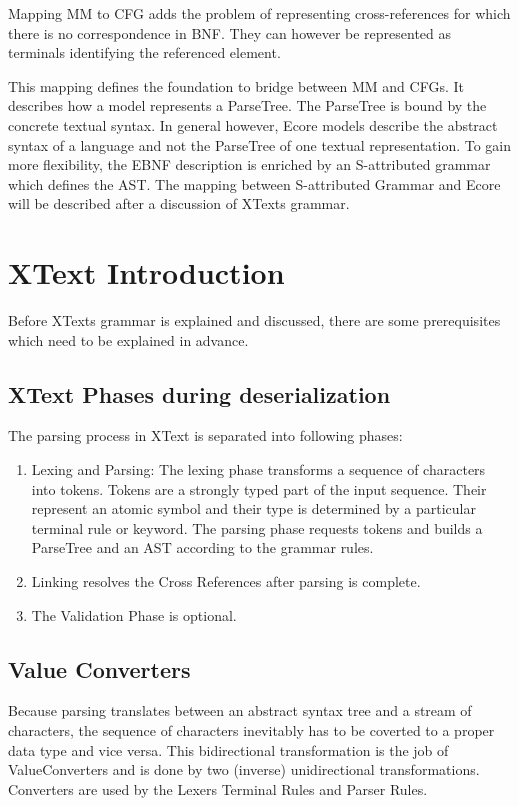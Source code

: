 Mapping MM to CFG adds the problem of representing cross-references for which there is no correspondence in BNF. They can however be represented as terminals identifying the referenced element.   

This mapping defines the foundation to bridge between MM and CFGs. It describes how a model represents a ParseTree. The ParseTree is bound by the concrete textual syntax. In general however, Ecore models describe the abstract syntax of a language and not the ParseTree of one textual representation. To gain more flexibility, the EBNF description is enriched by an S-attributed grammar which defines the AST. The mapping between S-attributed Grammar and Ecore will be described after a discussion of XTexts grammar. 



\section{XText Introduction}
Before XTexts grammar is explained and discussed, there are some prerequisites which need to be explained in advance.

\subsection{XText Phases during deserialization}
The parsing process in XText is separated into following phases:
\begin{enumerate}
	\item Lexing and Parsing: The lexing phase transforms a sequence of characters into tokens. Tokens are a strongly typed part of the input sequence. Their represent an atomic symbol and their type is determined by a particular terminal rule or keyword. The parsing phase requests tokens and builds a ParseTree and an AST according to the grammar rules.
	\item Linking resolves the Cross References after parsing is complete.
	\item The Validation Phase is optional.
\end{enumerate}

\subsection{Value Converters}
Because parsing translates between an abstract syntax tree and a stream of characters, the sequence of characters inevitably has to be coverted to a proper data type and vice versa. This bidirectional transformation is the job of ValueConverters and is done by two (inverse) unidirectional transformations. Converters are used by the Lexers Terminal Rules and Parser Rules.

